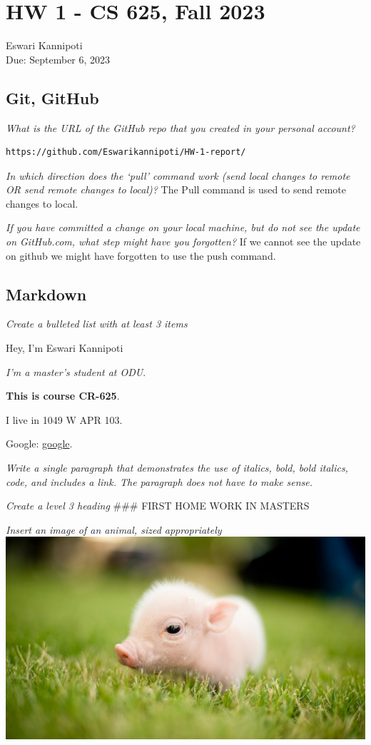 \documentclass[
]{article}
\author{}
\date{\vspace{-2.5em}}
\begin{document}
\hypertarget{hw-1---cs-625-fall-2023}{%
\section{HW 1 - CS 625, Fall 2023}\label{hw-1---cs-625-fall-2023}}

Eswari Kannipoti\\
Due: September 6, 2023

\hypertarget{git-github}{%
\subsection{Git, GitHub}\label{git-github}}

\emph{What is the URL of the GitHub repo that you created in your
personal account?}

\begin{verbatim}
https://github.com/Eswarikannipoti/HW-1-report/
\end{verbatim}

\emph{In which direction does the `pull' command work (send local
changes to remote OR send remote changes to local)?} The Pull command is
used to send remote changes to local.

\emph{If you have committed a change on your local machine, but do not
see the update on GitHub.com, what step might have you forgotten?} If we
cannot see the update on github we might have forgotten to use the push
command.

\hypertarget{markdown}{%
\subsection{Markdown}\label{markdown}}

\emph{Create a bulleted list with at least 3 items}

Hey, I'm Eswari Kannipoti

\emph{I'm a master's student at ODU}.

\textbf{This is course CR-625}.

I live in 1049 W APR 103.

Google: \href{https://www.google.com/}{google}.

\emph{Write a single paragraph that demonstrates the use of italics,
bold, bold italics, code, and includes a link. The paragraph does not
have to make sense.}

\emph{Create a level 3 heading} \#\#\# FIRST HOME WORK IN MASTERS

\emph{Insert an image of an animal, sized appropriately}
\includegraphics{pig.jpg}
\end{document}
